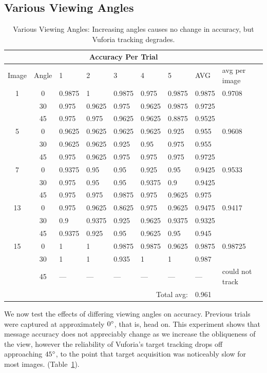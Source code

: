 \documentclass[11pt, letterpaper]{article}
\begin{document}
\subsection{Various Viewing Angles}
\begin{table}[t]
\caption{Various Viewing Angles: Increasing angles causes no change in accuracy, but Vuforia tracking degrades.}
\label{tab:angles}
\centering
\begin{tabular}{c c | l l l l l l l}
\\
&& \multicolumn{5}{c}{Accuracy Per Trial}&&\\
\toprule
Image&Angle&1&2&3&4&5&AVG&avg per image\\
\midrule
1&0&0.9875&1&0.9875&0.975&0.9875&0.9875&0.9708\\
&30&0.975&0.9625&0.975&0.9625&0.9875&0.9725&\\
&45&0.975&0.975&0.9625&0.9625&0.8875&0.9525&\\
5&0&0.9625&0.9625&0.9625&0.9625&0.925&0.955&0.9608\\
&30&0.9625&0.9625&0.925&0.95&0.975&0.955&\\
&45&0.975&0.9625&0.975&0.975&0.975&0.9725&\\
7&0&0.9375&0.95&0.95&0.925&0.95&0.9425&0.9533\\
&30&0.975&0.95&0.95&0.9375&0.9&0.9425&\\
&45&0.975&0.975&0.9875&0.975&0.9625&0.975&\\
13&0&0.975&0.9625&0.8625&0.975&0.9625&0.9475&0.9417\\
&30&0.9&0.9375&0.925&0.9625&0.9375&0.9325&\\
&45&0.9375&0.925&0.95&0.9625&0.95&0.945&\\
15&0&1&1&0.9875&0.9875&0.9625&0.9875&0.98725\\
&30&1&1&0.935&1&1&0.987&\\
&45&---&---&---&---&---&---&could not track\\ 
\bottomrule
&&&&&\multicolumn{2}{r}{Total avg:}&0.961&\\
\end{tabular}
\end{table}

We now test the effects of differing viewing angles on accuracy. Previous trials were captured at approximately $0 \degree$, that is, head on. This experiment shows that message accuracy does not appreciably change as we increase the obliqueness of the view, however the reliability of Vuforia's target tracking drops off approaching $45 \degree$, to the point that target acquisition was noticeably slow for most images. (Table~\ref{tab:angles}).
\end{document}
